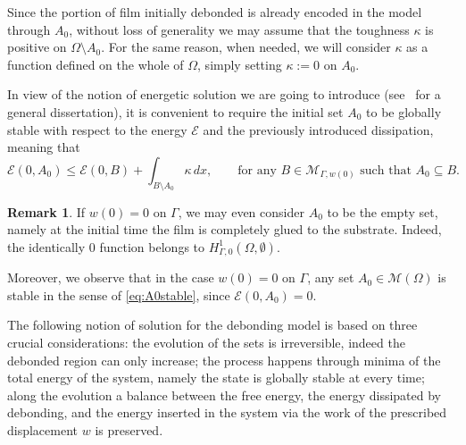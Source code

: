 \documentclass[a4paper,11pt,reqno]{amsart}
\numberwithin{equation}{section}
\theoremstyle{definition}
\newtheorem{remark}[teo]{Remark}
\theoremstyle{remark}
\begin{document}
Since the portion of film initially debonded is already encoded in the model through $A_0$, without loss of generality we may assume that the toughness $\kappa$ is positive on $\Omega\setminus A_0$. For the same reason, when needed, we will consider $\kappa$ as a function defined on the whole of $\Omega$, simply setting $\kappa:= 0$ on $A_0$.

In view of the notion of energetic solution we are going to introduce (see~\cite{MielRoubbook} for a general dissertation), it is convenient to require the initial set $A_0$ to be globally stable with respect to the energy $\mathcal E$ and the previously introduced dissipation, meaning that
\begin{equation}\label{eq:A0stable}
    \mathcal E(0,A_0)\le \mathcal E(0,B)+\int_{B\setminus A_0}\kappa\, dx,\qquad\text{for any }B\in \mathcal M_{\Gamma,w(0)} \text{ such that } A_0\subseteq B.
\end{equation}
\begin{remark}
    If $w(0)=0$ on $\Gamma$, we may even consider $A_0$ to be the empty set, namely at the initial time the film is completely glued to the substrate. Indeed, the identically $0$ function belongs to $H^1_{\Gamma,0}(\Omega,\emptyset)$.
    
    Moreover, we observe that in the case $w(0)=0$ on $\Gamma$, any set $A_0\in \mathcal M(\Omega)$ is stable in the sense of \eqref{eq:A0stable}, since $\mathcal E(0,A_0)=0$.
\end{remark}

The following notion of solution for the debonding model is based on three crucial considerations: the evolution of the sets is irreversible, indeed the debonded region can only increase; the process happens through minima of the total energy of the system, namely the state is globally stable at every time; along the evolution a balance between the free energy, the energy dissipated by debonding, and the energy inserted in the system via the work of the prescribed displacement $w$ is preserved.
\end{document}
